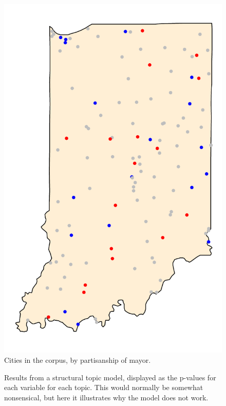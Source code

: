 \documentclass[11pt]{article}
\begin{document}
\begin{figure}[htp]
	\centering %
	\caption{Cities in the corpus, by partisanship of mayor.}
	\label{indiana_map}
	\includegraphics[height=0.75\textheight]{figures/indiana_map.pdf}
\end{figure}

\begin{figure}[htp]
	\centering %
	\caption{Results from a structural topic model, displayed as the p-values for each variable for each topic. This would normally be somewhat nonsensical, but here it illustrates why the model does not work.}
	\label{stm_results}
\end{figure}
\end{document}
